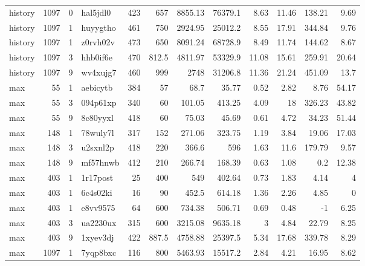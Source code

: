 \documentclass[9pt,twoside,lineno]{pnas-new}
\begin{document}
\begin{table}
\begin{tabular}{lrrlrrrrrrrr}
 history  & 1097 &   0 & hal5jdl0 & 423 &    657   &  8855.13 & 76379.1  &  8.63 &  11.46 & 138.21 &         9.69 \\
 history  & 1097 &   1 & huyygtho & 461 &    750   &  2924.95 & 25012.2  &  8.55 &  17.91 & 344.84 &         9.76 \\
 history  & 1097 &   1 & z0rvh02v & 473 &    650   &  8091.24 & 68728.9  &  8.49 &  11.74 & 144.62 &         8.67 \\
 history  & 1097 &   3 & hhb0if6e & 470 &    812.5 &  4811.97 & 53329.9  & 11.08 &  15.61 & 259.91 &        20.64 \\
 history  & 1097 &   9 & wv4xujg7 & 460 &    999   &  2748    & 31206.8  & 11.36 &  21.24 & 451.09 &        13.7  \\
 max      &   55 &   1 & aebicytb & 384 &     57   &    68.7  &    35.77 &  0.52 &   2.82 &   8.76 &        54.17 \\
 max      &   55 &   3 & 094p61xp & 340 &     60   &   101.05 &   413.25 &  4.09 &  18    & 326.23 &        43.82 \\
 max      &   55 &   9 & 8c80yyxl & 418 &     60   &    75.03 &    45.69 &  0.61 &   4.72 &  34.23 &        51.44 \\
 max      &  148 &   1 & 78wuly7l & 317 &    152   &   271.06 &   323.75 &  1.19 &   3.84 &  19.06 &        17.03 \\
 max      &  148 &   3 & u2sxnl2p & 418 &    220   &   366.6  &   596    &  1.63 &  11.6  & 179.79 &         9.57 \\
 max      &  148 &   9 & mf57hnwb & 412 &    210   &   266.74 &   168.39 &  0.63 &   1.08 &   0.2  &        12.38 \\
 max      &  403 &   1 & 1r17post &  25 &    400   &   549    &   402.64 &  0.73 &   1.83 &   4.14 &         4    \\
 max      &  403 &   1 & 6c4s02ki &  16 &     90   &   452.5  &   614.18 &  1.36 &   2.26 &   4.85 &         0    \\
 max      &  403 &   1 & e8vv9575 &  64 &    600   &   734.38 &   506.71 &  0.69 &   0.48 &  -1    &         6.25 \\
 max      &  403 &   3 & ua2230ux & 315 &    600   &  3215.08 &  9635.18 &  3    &   4.84 &  22.79 &         8.25 \\
 max      &  403 &   9 & 1xyev3dj & 422 &    887.5 &  4758.88 & 25397.5  &  5.34 &  17.68 & 339.78 &         8.29 \\
 max      & 1097 &   1 & 7yqp8bxc & 116 &    800   &  5463.93 & 15517.2  &  2.84 &   4.21 &  16.95 &         8.62 \\

\end{tabular}
\end{table}
\end{document}
